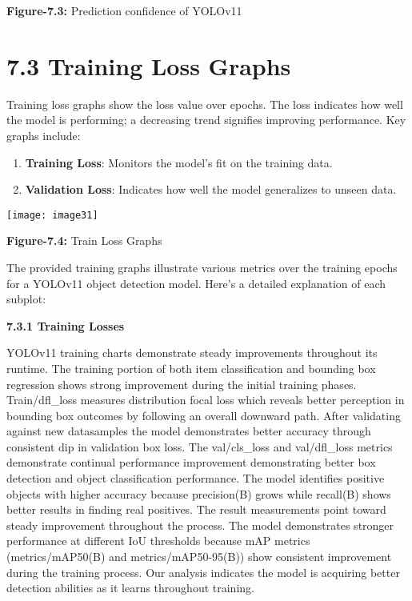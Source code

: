 \documentclass{book} %
\begin{document}
\textbf{}

\textbf{}

\textbf{Figure-7.3:} Prediction confidence of YOLOv11

\noindent 
\section{}

\noindent 
\section{7.3 Training Loss Graphs }

\noindent Training loss graphs show the loss value over epochs. The loss indicates how well the model is performing; a decreasing trend signifies improving performance. Key graphs include:

\begin{enumerate}
\item  \textbf{Training Loss}: Monitors the model's fit on the training data.

\item  \textbf{Validation Loss}: Indicates how well the model generalizes to unseen data.
\end{enumerate}

\noindent \texttt{[image: image31]}

\noindent \textbf{Figure-7.4: }Train Loss Graphs 

\noindent The provided training graphs illustrate various metrics over the training epochs for a YOLOv11 object detection model. Here's a detailed explanation of each subplot:

\noindent \textbf{}

\noindent \textbf{}

\noindent \textbf{7.3.1 Training Losses}

\noindent YOLOv11 training charts demonstrate steady improvements throughout its runtime. The training portion of both item classification and bounding box regression shows strong improvement during the initial training phases. Train/dfl\_loss measures distribution focal loss which reveals better perception in bounding box outcomes by following an overall downward path. After validating against new datasamples the model demonstrates better accuracy through consistent dip in validation box loss. The val/cls\_loss and val/dfl\_loss metrics demonstrate continual performance improvement demonstrating better box detection and object classification performance. The model identifies positive objects with higher accuracy because precision(B) grows while recall(B) shows better results in finding real positives. The result measurements point toward steady improvement throughout the process. The model demonstrates stronger performance at different IoU thresholds because mAP metrics (metrics/mAP50(B) and metrics/mAP50-95(B)) show consistent improvement during the training process. Our analysis indicates the model is acquiring better detection abilities as it learns throughout training. 
\end{document}
